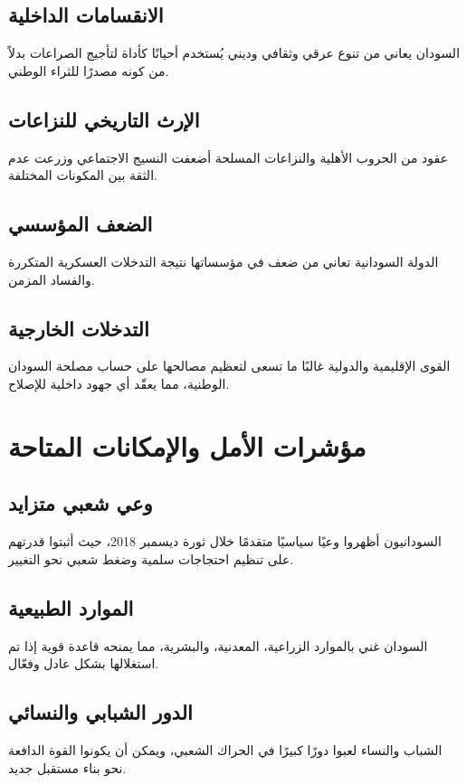 \documentclass[12pt]{article}
\begin{document}
\subsection{الانقسامات الداخلية}
السودان يعاني من تنوع عرقي وثقافي وديني يُستخدم أحيانًا كأداة لتأجيج الصراعات بدلاً من كونه مصدرًا للثراء الوطني.

\subsection{الإرث التاريخي للنزاعات}
عقود من الحروب الأهلية والنزاعات المسلحة أضعفت النسيج الاجتماعي وزرعت عدم الثقة بين المكونات المختلفة.

\subsection{الضعف المؤسسي}
الدولة السودانية تعاني من ضعف في مؤسساتها نتيجة التدخلات العسكرية المتكررة والفساد المزمن.

\subsection{التدخلات الخارجية}
القوى الإقليمية والدولية غالبًا ما تسعى لتعظيم مصالحها على حساب مصلحة السودان الوطنية، مما يعقّد أي جهود داخلية للإصلاح.

\section{مؤشرات الأمل والإمكانات المتاحة}
\subsection{وعي شعبي متزايد}
السودانيون أظهروا وعيًا سياسيًا متقدمًا خلال ثورة ديسمبر 2018، حيث أثبتوا قدرتهم على تنظيم احتجاجات سلمية وضغط شعبي نحو التغيير.

\subsection{الموارد الطبيعية}
السودان غني بالموارد الزراعية، المعدنية، والبشرية، مما يمنحه قاعدة قوية إذا تم استغلالها بشكل عادل وفعّال.

\subsection{الدور الشبابي والنسائي}
الشباب والنساء لعبوا دورًا كبيرًا في الحراك الشعبي، ويمكن أن يكونوا القوة الدافعة نحو بناء مستقبل جديد.
\end{document}
